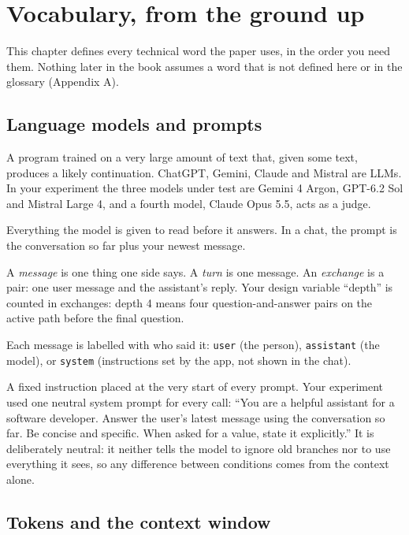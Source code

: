 \chapter{Vocabulary, from the ground up}

This chapter defines every technical word the paper uses, in the order you need them. Nothing later in the book assumes a word that is not defined here or in the glossary (Appendix A).

\section{Language models and prompts}

 A program trained on a very large amount of text that, given some text, produces a likely continuation. ChatGPT, Gemini, Claude and Mistral are LLMs. In your experiment the three models under test are Gemini 4 Argon, GPT-6.2 Sol and Mistral Large 4, and a fourth model, Claude Opus 5.5, acts as a judge.

 Everything the model is given to read before it answers. In a chat, the prompt is the conversation so far plus your newest message.

 A \emph{message} is one thing one side says. A \emph{turn} is one message. An \emph{exchange} is a pair: one user message and the assistant's reply. Your design variable ``depth'' is counted in exchanges: depth 4 means four question-and-answer pairs on the active path before the final question.

 Each message is labelled with who said it: \texttt{user} (the person), \texttt{assistant} (the model), or \texttt{system} (instructions set by the app, not shown in the chat).

 A fixed instruction placed at the very start of every prompt. Your experiment used one neutral system prompt for every call: ``You are a helpful assistant for a software developer. Answer the user's latest message using the conversation so far. Be concise and specific. When asked for a value, state it explicitly.'' It is deliberately neutral: it neither tells the model to ignore old branches nor to use everything it sees, so any difference between conditions comes from the context alone.

\section{Tokens and the context window}

